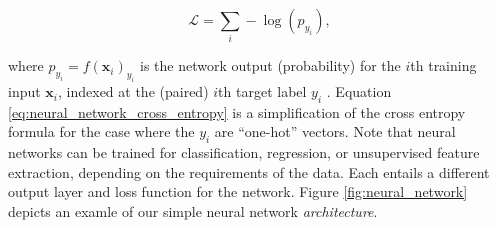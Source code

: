 \begin{equation}
\mathcal{L} = \sum_i -\log(p_{y_i}),
\label{eq:neural_network_cross_entropy}
\end{equation}

where $p_{y_i} = f(\mathbf{x}_i)_{y_i}$ is the network output (probability) for the $i$th training input $\mathbf{x}_i$, indexed at the (paired) $i$th target label $y_i$ . Equation \ref{eq:neural_network_cross_entropy} is a simplification of the cross entropy formula for the case where the $y_i$ are ``one-hot'' vectors. Note that neural networks can be trained for classification, regression, or unsupervised feature extraction, depending on the requirements of the data. Each entails a different output layer and loss function for the network. Figure \ref{fig:neural_network} depicts an examle of our simple neural network \emph{architecture}.

